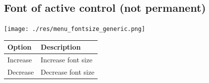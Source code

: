 \hypertarget{menu_view_fontsize}{}
\subsection{Font of active control (not permanent)}

\texttt{[image: ./res/menu\_fontsize\_generic.png]}\\

\begin{scriptsize}\begin{tabularx}{\textwidth}{>{\hsize=0.3\hsize}X>{\hsize=0.7\hsize}X}\\
    \hline
    \textbf{Option} & \textbf{Description} \\
    \hline
    Increase & Increase font size \\
    Decrease & Decrease font size \\
    \hline
  \end{tabularx}\end{scriptsize}
